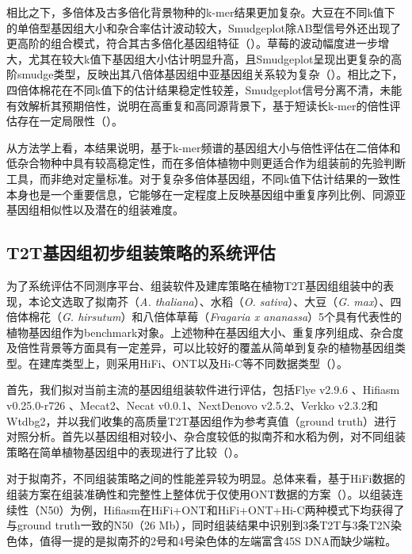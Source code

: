 相比之下，多倍体及古多倍化背景物种的k-mer结果更加复杂。大豆在不同k值下的单倍型基因组大小和杂合率估计波动较大，Smudgeplot除AB型信号外还出现了更高阶的组合模式，符合其古多倍化基因组特征（）。草莓的波动幅度进一步增大，尤其在较大k值下基因组大小估计明显升高，且Smudgeplot呈现出更复杂的高阶smudge类型，反映出其八倍体基因组中亚基因组关系较为复杂（）。相比之下，四倍体棉花在不同k值下的估计结果稳定性较差，Smudgeplot信号分离不清，未能有效解析其预期倍性，说明在高重复和高同源背景下，基于短读长k-mer的倍性评估存在一定局限性（）。

从方法学上看，本结果说明，基于k-mer频谱的基因组大小与倍性评估在二倍体和低杂合物种中具有较高稳定性，而在多倍体植物中则更适合作为组装前的先验判断工具，而非绝对定量标准。对于复杂多倍体基因组，不同k值下估计结果的一致性本身也是一个重要信息，它能够在一定程度上反映基因组中重复序列比例、同源亚基因组相似性以及潜在的组装难度。

\subsection{T2T基因组初步组装策略的系统评估}

为了系统评估不同测序平台、组装软件及建库策略在植物T2T基因组组装中的表现，本论文选取了拟南芥（\textit{A. thaliana}）、水稻（\textit{O. sativa}）、大豆（\textit{G. max}）、四倍体棉花（\textit{G. hirsutum}）和八倍体草莓（\textit{Fragaria x ananassa}）5个具有代表性的植物基因组作为benchmark对象。上述物种在基因组大小、重复序列组成、杂合度及倍性背景等方面具有一定差异，可以比较好的覆盖从简单到复杂的植物基因组类型。在建库类型上，则采用HiFi、ONT以及Hi-C等不同数据类型（）。

首先，我们拟对当前主流的基因组组装软件进行评估，包括Flye v2.9.6 \citep{kolmogorov2019assembly}、Hifiasm v0.25.0-r726 \citep{cheng2021haplotype}、Mecat2\citep{xiao2017mecat}、Necat v0.0.1\citep{chen2021efficient}、NextDenovo v2.5.2\citep{hu2024nextdenovo}、Verkko v2.3.2\citep{rautiainen2023telomere}和Wtdbg2\citep{ruan2020fast}，并以我们收集的高质量T2T基因组作为参考真值（ground truth）进行对照分析。首先以基因组相对较小、杂合度较低的拟南芥和水稻为例，对不同组装策略在简单植物基因组中的表现进行了比较（）。

对于拟南芥，不同组装策略之间的性能差异较为明显。总体来看，基于HiFi数据的组装方案在组装准确性和完整性上整体优于仅使用ONT数据的方案（）。以组装连续性（N50）为例，Hifiasm在HiFi+ONT和HiFi+ONT+Hi-C两种模式下均获得了与ground truth一致的N50（26 Mb），同时组装结果中识别到3条T2T与3条T2N染色体，值得一提的是拟南芥的2号和4号染色体的左端富含45S DNA而缺少端粒\cite{naish2021genetic}。

